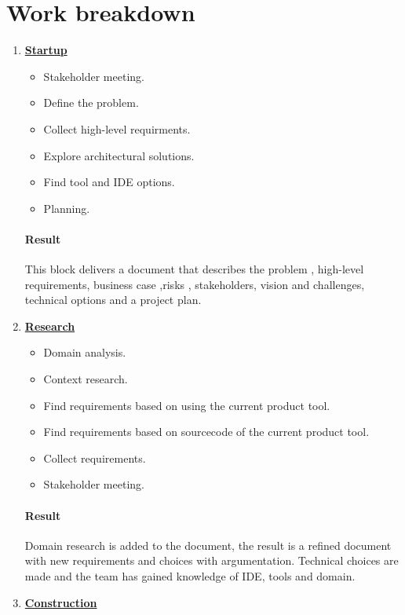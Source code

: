\documentclass[a4paper,11pt,twoside,draft]{article}
\begin{document}
\section{Work breakdown}

\begin{enumerate}
	\item \underline{\textbf{Startup}}
	\begin{itemize}
		\item Stakeholder meeting.
		\item Define the problem.
		\item Collect high-level requirments.
		\item Explore architectural solutions.
		\item Find tool and IDE options.
		\item Planning. 
	\end{itemize}
	\paragraph{Result}
	This block delivers a document that describes the problem , high-level requirements, business case ,risks , stakeholders, vision and challenges, technical options and a project plan.
	
	\item \underline{\textbf{Research}}
		\begin{itemize}
			\item Domain analysis.
			\item Context research.
			\item Find requirements based on using the current product tool.
			\item Find requirements based on sourcecode of the current product tool.
			\item Collect requirements.
			\item Stakeholder meeting.
		\end{itemize}
	\paragraph{Result}
	Domain research is added to the document, the result is a refined document with new requirements and choices with argumentation. Technical choices are made and the team has gained knowledge of IDE, tools and domain. 
		
	\item \underline{\textbf{Construction}}
	

\end{enumerate}
\end{document}

